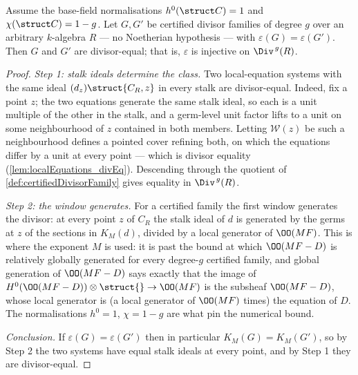 \begin{theorem}
  \label{thm:divFam_mono}
  \leanok
  Assume the base-field normalisations \(h^0(\struct C) = 1\) and
  \(\chi(\struct C) = 1 - g\). Let \(G, G'\) be certified divisor families of degree \(g\)
  over an arbitrary \(k\)-algebra \(R\) --- no Noetherian hypothesis --- with
  \(\varepsilon(G) = \varepsilon(G')\). Then \(G\) and \(G'\) are divisor-equal; that is,
  \(\varepsilon\) is injective on \(\Div^{\,g}(R)\).
\end{theorem}
\begin{proof}
  \leanok
  \emph{Step 1: stalk ideals determine the class.} Two local-equation systems with the same
  ideal \((d_z)\struct{C_R,z}\) in every stalk are divisor-equal. Indeed, fix a point
  \(z\); the two equations generate the same stalk ideal, so each is a unit multiple of the
  other in the stalk, and a germ-level unit factor lifts to a unit on some neighbourhood of
  \(z\) contained in both members. Letting \(\mathcal W(z)\) be such a neighbourhood defines
  a pointed cover refining both, on which the equations differ by a unit at every point ---
  which is divisor equality (\ref{lem:localEquations_divEq}). Descending through the
  quotient of \ref{def:certifiedDivisorFamily} gives equality in \(\Div^{\,g}(R)\).

  \emph{Step 2: the window generates.} For a certified family the first window generates the
  divisor: at every point \(z\) of \(C_R\) the stalk ideal of \(d\) is generated by the
  germs at \(z\) of the sections in \(K_M(d)\), divided by a local generator of
  \(\OO(MF)\). This is where the exponent \(M\) is used: it is past the bound at which
  \(\OO(MF - D)\) is relatively globally generated for every degree-\(g\) certified family,
  and global generation of \(\OO(MF-D)\) says exactly that the image of
  \(H^0(\OO(MF-D)) \otimes \struct{} \to \OO(MF)\) is the subsheaf \(\OO(MF-D)\), whose
  local generator is (a local generator of \(\OO(MF)\) times) the equation of \(D\). The
  normalisations \(h^0 = 1\), \(\chi = 1-g\) are what pin the numerical bound.

  \emph{Conclusion.} If \(\varepsilon(G) = \varepsilon(G')\) then in particular
  \(K_M(G) = K_M(G')\), so by Step 2 the two systems have equal stalk ideals at every
  point, and by Step 1 they are divisor-equal.
\end{proof}

